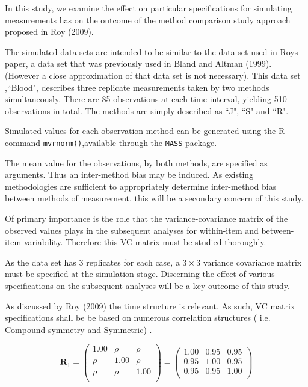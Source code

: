 \documentclass[a4paper,12pt]{article}
\begin{document}
\tableofcontents
\newpage
In this study, we examine the effect on particular specifications for simulating measurements has on the outcome of the method comparison study approach proposed in Roy (2009).

The simulated data sets are intended to be similar to the data set used in Roys paper, a data set that was previously used in Bland and Altman (1999). (However a close approximation of that data set is not necessary). This data set ,``Blood", describes three replicate measurements taken by two methods simultaneously. There are 85 observations at each time interval, yielding 510 observations in total. The methods  are simply described as ``J", ``S" and ``R".

Simulated values for each observation method can be generated using the R command  \texttt{mvrnorm()},available through the \texttt{MASS} package.

The mean value for the observations, by both methods, are specified as arguments. Thus an inter-method bias may be induced.  As existing methodologies are sufficient to appropriately determine inter-method bias between methods of measurement,  this will be a secondary concern of this study.

Of primary importance is the role that the variance-covariance matrix of the observed values plays in the subsequent analyses for within-item and between-item variability. Therefore this VC matrix must be studied thoroughly.

As the data set has 3 replicates for each case, a $3 \times  3$ variance covariance matrix must be specified at the simulation stage.  Discerning the effect of various specifications on the subsequent analyses will be a key outcome of this study.

As discussed by Roy (2009) the time structure is relevant. As such,  VC matrix specifications shall be be based on numerous correlation structures ( i.e. Compound symmetry and Symmetric) .

\[
\boldsymbol{R}_1 = \left(\begin{array}{ccc}
1.00 & \rho & \rho \\
\rho & 1.00 & \rho \\
\rho & \rho & 1.00\\
\end{array} \right)
=
\left(\begin{array}{ccc}
1.00 & 0.95 & 0.95 \\
0.95 & 1.00 & 0.95 \\
0.95 & 0.95 & 1.00\\
\end{array} \right)\]
\end{document}
